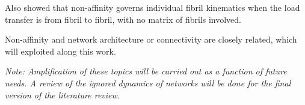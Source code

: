  Also \citet{chandran_affine_2006}
showed that non-affinity governs individual fibril kinematics when the load
transfer is from fibril to fibril, with no matrix of fibrils involved.

Non-affinity and network architecture or connectivity are closely related, which
will exploited along this work.

\emph{Note: Amplification of these topics will be carried out as a function of
future needs.
A review of the ignored dynamics of networks will be done for the final version of the
literature review.}









